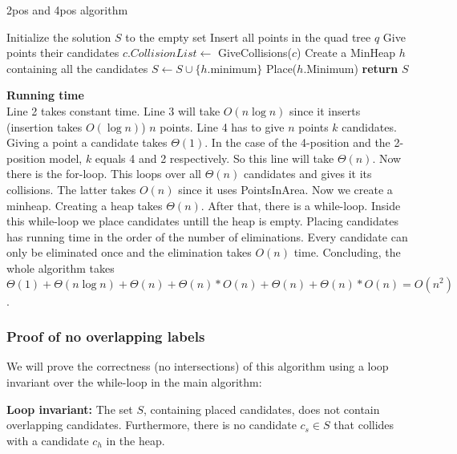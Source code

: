 \documentclass[crop=false,a4paper,oneside,11pt]{article}
\begin{document}
\begin{algorithm}[H]
\caption{2pos and 4pos algorithm}
\begin{algorithmic}[1]
\State Initialize the solution $S$ to the empty set
\State Insert all points in the quad tree $q$
\State Give points their candidates
\State $c.CollisionList\gets$ GiveCollisions($c$)
\EndFor
\State Create a MinHeap $h$ containing all the candidates
\State $S\gets S\cup \{h.$minimum$\}$
\State Place($h$.Minimum)
\EndWhile
\State \textbf{return} $S$
\EndProcedure
\end{algorithmic}
\end{algorithm}
\textbf{Running time}\\
Line 2 takes constant time. Line 3 will take $O(n\log n)$ since it inserts (insertion takes $O(\log n)$) $n$ points. Line 4 has to give $n$ points $k$ candidates. Giving a point a candidate takes $\Theta(1)$. In the case of the 4-position and the 2-position model, $k$ equals 4 and 2 respectively. So this line will take $\Theta(n)$. Now there is the for-loop. This loops over all $\Theta(n)$ candidates and gives it its collisions. The latter takes $O(n)$ since it uses PointsInArea. Now we create a minheap. Creating a heap takes $\Theta(n)$. After that, there is a while-loop. Inside this while-loop we place candidates untill the heap is empty. Placing candidates has running time in the order of the number of eliminations. Every candidate can only be eliminated once and the elimination takes $O(n)$ time. Concluding, the whole algorithm takes $\Theta(1)+\Theta(n\log n)+\Theta(n)+\Theta(n)*O(n)+\Theta(n)+\Theta(n)*O(n)=O(n^2)$.

\subsubsection{Proof of no overlapping labels}
We will prove the correctness (no intersections) of this algorithm using a loop invariant over the while-loop in the main algorithm:

\textbf{Loop invariant:} The set $S$, containing placed candidates, does not contain overlapping candidates. Furthermore, there is no candidate $c_s\in S$ that collides with a candidate $c_h$ in the heap.
\end{document}
